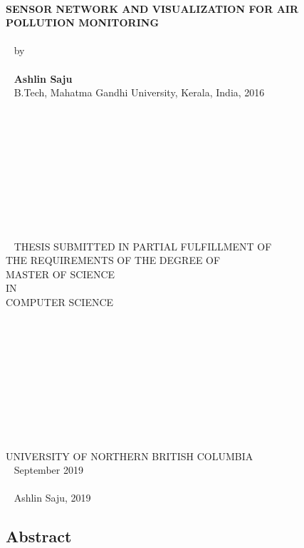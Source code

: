 \documentclass[a4paper,12pt,titlepage,oneside]{report}
\begin{document}
\begin{center}
	\textbf{{\textsf{\\ SENSOR NETWORK AND VISUALIZATION FOR AIR POLLUTION MONITORING}}}
	\\~
	\\~
	\textsf{by}
	\\~
	\\~
	\textbf{\textsf{Ashlin Saju}}
	\\~
	\textsf{B.Tech, Mahatma Gandhi University, Kerala, India, 2016}
	\\~
	\\~
	\\~
	\\~
	\\~
	\\~
	\\~
	\\~
	\\~
	\\~
	\\~
	\textsf{THESIS SUBMITTED IN PARTIAL FULFILLMENT OF}\\
	\textsf{THE REQUIREMENTS OF THE DEGREE OF}\\
	\textsf{MASTER OF SCIENCE}\\
	\textsf{IN}\\
	\textsf{COMPUTER SCIENCE}
	\\~
	\\~
	\\~
	\\~
	\\~
	\\~
	\\~
	\\~
	\\~
	\\~
	\\
	\textsf{UNIVERSITY OF NORTHERN BRITISH COLUMBIA}
	\\~
	\textsf{September 2019}
	\\~
	\\~
	\textcopyright \textsf{ Ashlin Saju, 2019}

\end{center}


\doublespacing
\normalsize

\newpage
{}

\subsection*{Abstract}
\end{document}
